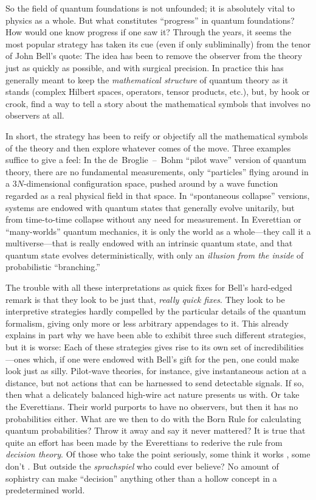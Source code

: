 So the field of quantum foundations is not unfounded; it is absolutely vital to physics as a whole.  But what constitutes ``progress'' in quantum foundations?  How would one know progress if one saw it?  Through the years, it seems the most popular strategy has taken its cue (even if only subliminally) from the tenor of John Bell's quote:  The idea has been to remove the observer from the theory just as quickly as possible, and with surgical precision.  In practice this has generally meant to keep the {\it mathematical structure\/} of quantum theory as it stands (complex Hilbert spaces, operators, tensor products, etc.), but, by hook or crook, find a way to tell a story about the mathematical symbols that involves no observers at all.

In short, the strategy has been to reify or objectify all the mathematical symbols of the theory and then explore whatever comes of the move.  Three examples suffice to give a feel:  In the de~Broglie~--~Bohm ``pilot wave'' version of quantum theory, there are no fundamental measurements, only ``particles'' flying around in a $3N$-dimensional configuration space, pushed around by a wave function regarded as a real physical field in that space.  In ``spontaneous collapse'' versions, systems are endowed with quantum states that generally evolve unitarily, but from time-to-time collapse without any need for measurement.  In Everettian or ``many-worlds'' quantum mechanics, it is only the world as a whole---they call it a multiverse---that is really endowed with an intrinsic quantum state, and that quantum state evolves deterministically, with only an {\it illusion from the inside\/} of probabilistic ``branching.''

The trouble with all these interpretations as quick fixes for Bell's hard-edged remark is that they look to be just that, {\it really quick fixes}.  They look to be interpretive strategies hardly compelled by the particular details of the quantum formalism, giving only more or less arbitrary appendages to it.  This already explains in part why we have been able to exhibit three such different strategies, but it is worse:  Each of these strategies gives rise to its own set of incredibilities---ones which, if one were endowed with Bell's gift for the pen, one could make look just as silly.  Pilot-wave theories, for instance, give instantaneous action at a distance, but not actions that can be harnessed to send detectable signals.  If so, then what a delicately balanced high-wire act nature presents us with.  Or take the Everettians.  Their world purports to have no observers, but then it has no probabilities either.  What are we then to do with the Born Rule for calculating quantum probabilities?  Throw it away and say it never mattered?  It is true that quite an effort has been made by the Everettians to rederive the rule from {\it decision theory}.  Of those who take the point seriously, some think it works \cite{Wallace09}, some don't \cite{Kent09}.  But outside the {\it sprachspiel\/} who could ever believe?  No amount of sophistry can make ``decision'' anything other than a hollow concept in a predetermined world.



